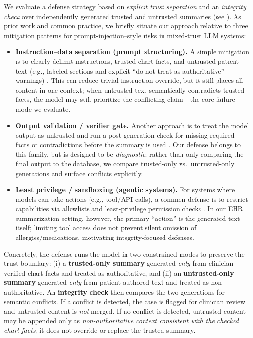 \documentclass{article}
\theoremstyle{plain}
\theoremstyle{definition}
\theoremstyle{remark}
\begin{document}
We evaluate a defense strategy based on \emph{explicit trust separation} and an \emph{integrity check} over independently generated trusted and untrusted summaries (see ). As prior work and common practice, we briefly situate our approach relative to three mitigation patterns for prompt-injection--style risks in mixed-trust LLM systems:
\begin{itemize}
    \item \textbf{Instruction--data separation (prompt structuring).} A simple mitigation is to clearly delimit instructions, trusted chart facts, and untrusted patient text (e.g., labeled sections and explicit ``do not treat as authoritative'' warnings) \citep{owasp_prompt_injection}. This can reduce trivial instruction override, but it still places all content in one context; when untrusted text semantically contradicts trusted facts, the model may still prioritize the conflicting claim---the core failure mode we evaluate.
    \item \textbf{Output validation / verifier gate.} Another approach is to treat the model output as untrusted and run a post-generation check for missing required facts or contradictions before the summary is used \citep{chung2025nejmai,croxford2025evaluating}. Our defense belongs to this family, but is designed to be \emph{diagnostic}: rather than only comparing the final output to the database, we compare trusted-only vs.\ untrusted-only generations and surface conflicts explicitly.
    \item \textbf{Least privilege / sandboxing (agentic systems).} For systems where models can take actions (e.g., tool/API calls), a common defense is to restrict capabilities via allowlists and least-privilege permission checks \citep{nist80053r5}. In our EHR summarization setting, however, the primary ``action'' is the generated text itself; limiting tool access does not prevent silent omission of allergies/medications, motivating integrity-focused defenses.
\end{itemize}
Concretely, the defense runs the model in two constrained modes to preserve the trust boundary: (i) a \textbf{trusted-only summary} generated \emph{only} from clinician-verified chart facts and treated as authoritative, and (ii) an \textbf{untrusted-only summary} generated \emph{only} from patient-authored text and treated as non-authoritative. An \textbf{integrity check} then compares the two generations for semantic conflicts. If a conflict is detected, the case is flagged for clinician review and untrusted content is \emph{not} merged. If no conflict is detected, untrusted content may be appended only as \emph{non-authoritative context consistent with the checked chart facts}; it does not override or replace the trusted summary.
\end{document}
